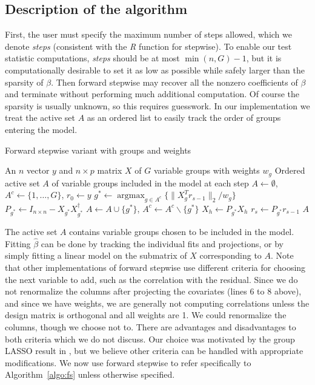 \documentclass{imsart}
\newcommand{\argmax}{\mathop{\mathrm{argmax}}}
\newcommand{\norm}[1]{\lVert #1 \rVert}
\begin{document}
\subsection{Description of the algorithm}

First, the user must specify the maximum number of steps allowed,
which we denote \textit{steps} (consistent with the \textit{R} function
for stepwise). To enable our test statistic computations,
\textit{steps} should be at most $\min (n, G) - 1$, but it is
computationally desirable to set it as low as possible while
safely larger than the sparsity of $\beta$. 
Then forward stepwise may recover all the nonzero
coefficients of $\beta$ and terminate without performing much
additional computation.
Of course the sparsity is usually unknown, so this requires guesswork.
In our implementation we treat the active set $A$ as an ordered list to easily track the order of groups entering the model.

\begin{algorithm}
  \caption{Forward stepwise variant with groups and weights}
  \label{algo:fs}
  \begin{algorithmic}[1]
    \REQUIRE An $n$ vector $y$ and $n \times p$ matrix $X$ of $G$ variable groups with weights $w_g$
    \ENSURE Ordered active set $A$ of variable groups included in the model at each step
    \STATE $A \gets \emptyset$, $A^c \gets \{ 1, \ldots, G\}$, $r_0 \gets y$
    \STATE $g^* \gets \argmax_{g \in A^c} \{ \norm{X_g^Tr_{s-1}}_2 / w_g \}$
    \STATE $P_{g^*} \gets I_{n\times n} - X_{g^*}X_{g^*}^\dagger$
    \STATE $A \gets A \cup \{ g^* \}$, $A^c \gets A^c \backslash \{ g^* \}$
      \STATE $X_h \gets P_{g^*} X_h$
    \ENDFOR
    \STATE $r_s \gets P_{g^*} r_{s-1}$
    \ENDFOR
    \RETURN $A$
  \end{algorithmic}
\end{algorithm}

The active set $A$ contains variable groups chosen to be included in
the model. Fitting $\hat \beta$ can be done by tracking the individual
fits and projections, or by simply fitting a linear model on the submatrix
of $X$ corresponding to $A$. 
 Note that other
implementations of forward stepwise use different criteria for choosing
the next variable to add, such as the correlation with the residual.
Since we do not renormalize the columns after projecting the covariates
(lines 6 to 8 above), and since we have weights, we are generally not computing
correlations unless the design matrix is orthogonal and all weights are 1. We could
renormalize the columns, though we choose not to.
There are advantages and disadvantages to both criteria which we do not
discuss. Our choice was motivated by the group LASSO result in
\cite{tests:adaptive}, but we believe other criteria can be handled
with appropriate modifications.
We now use forward stepwise to refer specifically to
Algorithm~\ref{algo:fs} unless otherwise specified.
\end{document}
